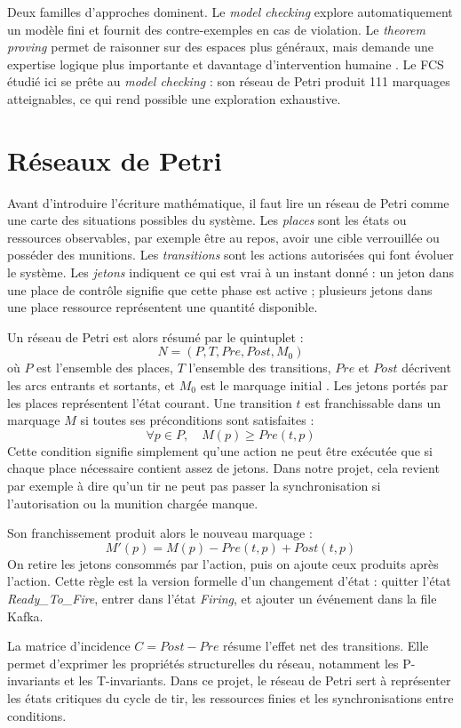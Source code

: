 \documentclass[11pt,a4paper]{report}
\begin{document}
Deux familles d'approches dominent. Le \emph{model checking} explore automatiquement un modèle fini et fournit des contre-exemples en cas de violation. Le \emph{theorem proving} permet de raisonner sur des espaces plus généraux, mais demande une expertise logique plus importante et davantage d'intervention humaine \citep{clarke1999,baier2008}. Le FCS étudié ici se prête au \emph{model checking} : son réseau de Petri produit 111 marquages atteignables, ce qui rend possible une exploration exhaustive.

\section{Réseaux de Petri}
Avant d'introduire l'écriture mathématique, il faut lire un réseau de Petri comme une carte des situations possibles du système. Les \emph{places} sont les états ou ressources observables, par exemple être au repos, avoir une cible verrouillée ou posséder des munitions. Les \emph{transitions} sont les actions autorisées qui font évoluer le système. Les \emph{jetons} indiquent ce qui est vrai à un instant donné : un jeton dans une place de contrôle signifie que cette phase est active ; plusieurs jetons dans une place ressource représentent une quantité disponible.

Un réseau de Petri est alors résumé par le quintuplet :
\[
N = (P, T, Pre, Post, M_0)
\]
où $P$ est l'ensemble des places, $T$ l'ensemble des transitions, $Pre$ et $Post$ décrivent les arcs entrants et sortants, et $M_0$ est le marquage initial \citep{murata1989,peterson1981}. Les jetons portés par les places représentent l'état courant. Une transition $t$ est franchissable dans un marquage $M$ si toutes ses préconditions sont satisfaites :
\[
\forall p \in P,\quad M(p) \geq Pre(t,p)
\]
Cette condition signifie simplement qu'une action ne peut être exécutée que si chaque place nécessaire contient assez de jetons. Dans notre projet, cela revient par exemple à dire qu'un tir ne peut pas passer la synchronisation si l'autorisation ou la munition chargée manque.

Son franchissement produit alors le nouveau marquage :
\[
M'(p) = M(p) - Pre(t,p) + Post(t,p)
\]
On retire les jetons consommés par l'action, puis on ajoute ceux produits après l'action. Cette règle est la version formelle d'un changement d'état : quitter l'état \emph{Ready\_To\_Fire}, entrer dans l'état \emph{Firing}, et ajouter un événement dans la file Kafka.

La matrice d'incidence $C = Post - Pre$ résume l'effet net des transitions. Elle permet d'exprimer les propriétés structurelles du réseau, notamment les P-invariants et les T-invariants. Dans ce projet, le réseau de Petri sert à représenter les états critiques du cycle de tir, les ressources finies et les synchronisations entre conditions.
\end{document}
